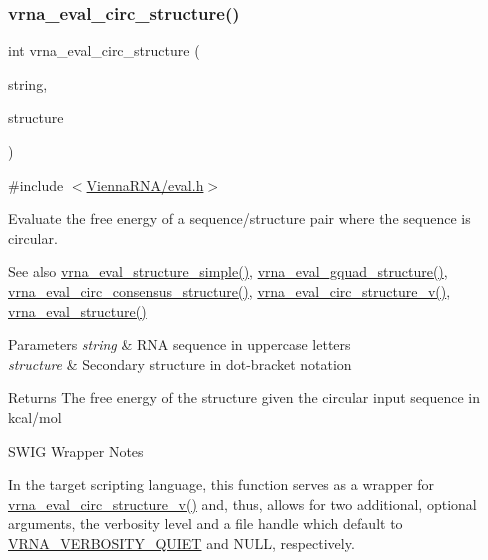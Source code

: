 \subsubsection{\texorpdfstring{vrna\+\_\+eval\+\_\+circ\+\_\+structure()}{vrna\_eval\_circ\_structure()}}
{\footnotesize\ttfamily int vrna\+\_\+eval\+\_\+circ\+\_\+structure (\begin{DoxyParamCaption}\item[{const char $\ast$}]{string,  }\item[{const char $\ast$}]{structure }\end{DoxyParamCaption})}



{\ttfamily \#include $<$\hyperlink{eval_8h}{Vienna\+R\+N\+A/eval.\+h}$>$}



Evaluate the free energy of a sequence/structure pair where the sequence is circular. 

\begin{DoxySeeAlso}{See also}
\hyperlink{group__eval_ga7e5273464b775d4130245681312c1369}{vrna\+\_\+eval\+\_\+structure\+\_\+simple()}, \hyperlink{group__eval_ga3263504825ef4b523eba797c99921df4}{vrna\+\_\+eval\+\_\+gquad\+\_\+structure()}, \hyperlink{group__eval_gac96577cf232c71160f762737a994b7c6}{vrna\+\_\+eval\+\_\+circ\+\_\+consensus\+\_\+structure()}, \hyperlink{group__eval_gac3fb44e0773a51be8efc5f4f595a94a7}{vrna\+\_\+eval\+\_\+circ\+\_\+structure\+\_\+v()}, \hyperlink{group__eval_ga58f199f1438d794a265f3b27fc8ea631}{vrna\+\_\+eval\+\_\+structure()}
\end{DoxySeeAlso}

\begin{DoxyParams}{Parameters}
{\em string} & R\+NA sequence in uppercase letters \\
\hline
{\em structure} & Secondary structure in dot-\/bracket notation \\
\hline
\end{DoxyParams}
\begin{DoxyReturn}{Returns}
The free energy of the structure given the circular input sequence in kcal/mol
\end{DoxyReturn}
\begin{DoxyRefDesc}{S\+W\+I\+G Wrapper Notes}
\item[\hyperlink{wrappers__wrappers000042}{S\+W\+I\+G Wrapper Notes}]In the target scripting language, this function serves as a wrapper for \hyperlink{group__eval_gac3fb44e0773a51be8efc5f4f595a94a7}{vrna\+\_\+eval\+\_\+circ\+\_\+structure\+\_\+v()} and, thus, allows for two additional, optional arguments, the verbosity level and a file handle which default to \hyperlink{group__eval_gaf4afe19780b61b4962c613bde324128b}{V\+R\+N\+A\+\_\+\+V\+E\+R\+B\+O\+S\+I\+T\+Y\+\_\+\+Q\+U\+I\+ET} and N\+U\+LL, respectively. \end{DoxyRefDesc}
\mbox{\label{group__eval_ga3263504825ef4b523eba797c99921df4}} 

